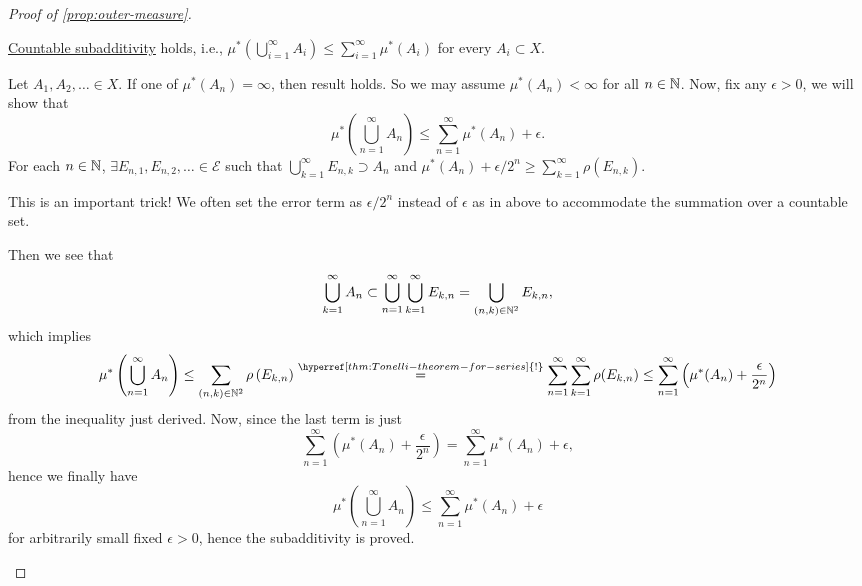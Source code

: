 \begin{proof}[Proof of \autoref{prop:outer-measure}]
	\begin{claim}
		\hyperref[def:outer-measure-countable-subadditivity]{Countable subadditivity} holds, i.e., \(\mu^{*} \left(\bigcup\limits_{i=1}^{\infty} A_{i}\right) \leq \sum\limits_{i=1}^{\infty} \mu^{*} (A_{i})\) for every \(A_{i} \subset X \).
	\end{claim}
	\begin{explanation}
		Let \(A_1, A_2, \ldots \in X \). If one of \(\mu^{*} (A_{n}) = \infty \), then result holds.
		So we may assume \(\mu^{*} (A_n)<\infty \) for all \(n\in \mathbb{\MakeUppercase{N}} \). Now, fix any \(\epsilon >0\),
		we will show that
		\[
			\mu^{*} \left(\bigcup\limits_{n=1}^{\infty} A_n\right)\leq \sum\limits_{n=1}^{\infty} \mu^{*} (A_n)+\epsilon.
		\]
		For each \(n\in\mathbb{\MakeUppercase{N}} \), \(\exists E_{n, 1}, E_{n, 2}, \ldots \in \mathcal{E}\) such that
		\(\bigcup\limits_{k=1}^{\infty} E_{n, k}\supset A_n\) and \(\mu^{*} (A_n) + \epsilon /2^n \geq \sum\limits_{k=1}^{\infty} \rho(E_{n, k})\).
		\begin{remark}
			This is an important trick! We often set the error term as \(\epsilon / 2^n\) instead of \(\epsilon \) as in above to accommodate the summation over
			a countable set.
		\end{remark}

		Then we see that
		\[
			\bigcup\limits_{k=1}^{\infty} A_n \subset \bigcup\limits_{n=1}^{\infty} \bigcup\limits_{k=1}^{\infty} E_{k, n} = \bigcup\limits_{(n, k)\in\mathbb{\MakeUppercase{N}} ^2} E_{k, n},
		\]
		which implies
		\[
			\mu^{*} \left(\bigcup\limits_{n=1}^{\infty} A_{n}\right)
			\leq \sum\limits_{(n, k)\in\mathbb{\MakeUppercase{N}} ^2} \rho\left(E_{k, n}\right)
			\overset{\hyperref[thm:Tonelli-theorem-for-series]{\text{!}}}{=} \sum\limits_{n=1}^{\infty} \sum\limits_{k=1}^{\infty} \rho(E_{k, n})
			\leq \sum\limits_{n=1}^{\infty} \left(\mu^{*} (A_n) + \frac{\epsilon}{2^n}\right)
		\]
		from the inequality just derived. Now, since the last term is just
		\[
			\sum\limits_{n=1}^{\infty} \left(\mu^{*} (A_n) + \frac{\epsilon}{2^n}\right) = \sum\limits_{n=1}^{\infty} \mu^{*} (A_n)+\epsilon,
		\]
		hence we finally have
		\[
			\mu^{*} \left(\bigcup\limits_{n=1}^{\infty} A_{n}\right)\leq \sum\limits_{n=1}^{\infty} \mu^{*} (A_n)+\epsilon
		\]
		for arbitrarily small fixed \(\epsilon >0\), hence the subadditivity is proved.
	\end{explanation}
\end{proof}

